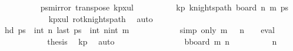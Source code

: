 \begin{isabellebody}
\ \ \ \ \ \ \ \ \isamarkupfalse%
\ {\isacharquery}{\kern0pt}ps{\isacharequal}{\kern0pt}{\isachardoublequoteopen}mirror{}\ {\isacharparenleft}{\kern0pt}transpose\ kp{}x{}ul{\isacharparenright}{\kern0pt}{\isachardoublequoteclose}\isanewline
\ \ \ \ \ \ \ \ \isamarkupfalse%
\ kp{\isacharcolon}{\kern0pt}\ {\isachardoublequoteopen}knights{\isacharunderscore}{\kern0pt}path\ {\isacharparenleft}{\kern0pt}board\ n\ m{\isacharparenright}{\kern0pt}\ {\isacharquery}{\kern0pt}ps{\isachardoublequoteclose}\isanewline
\ \ \ \ \ \ \ \ \ \ \isamarkupfalse%
\ kp{\isacharunderscore}{\kern0pt}{}x{}{\isacharunderscore}{\kern0pt}ul\ rot{}{}{\isacharunderscore}{\kern0pt}knights{\isacharunderscore}{\kern0pt}path\ \isamarkupfalse%
\ auto\isanewline
\ \ \ \ \ \ \ \ \isamarkupfalse%
\ {\isachardoublequoteopen}hd\ {\isacharquery}{\kern0pt}ps\ {\isacharequal}{\kern0pt}\ {\isacharparenleft}{\kern0pt}int\ n{\isacharcomma}{\kern0pt}{}{\isacharparenright}{\kern0pt}{\isachardoublequoteclose}\ {\isachardoublequoteopen}last\ {\isacharquery}{\kern0pt}ps\ {\isacharequal}{\kern0pt}\ {\isacharparenleft}{\kern0pt}int\ n{\isacharminus}{\kern0pt}{}{\isacharcomma}{\kern0pt}int\ m{\isacharminus}{\kern0pt}{}{\isacharparenright}{\kern0pt}{\isachardoublequoteclose}\isanewline
\ \ \ \ \ \ \ \ \ \ \isamarkupfalse%
\ {\isacharparenleft}{\kern0pt}simp\ only{\isacharcolon}{\kern0pt}\ {\isacartoucheopen}m\ {\isacharequal}{\kern0pt}\ {}{\isacartoucheclose}\ {\isacartoucheopen}n\ {\isacharequal}{\kern0pt}\ {}{\isacartoucheclose}\ {\isacharbar}{\kern0pt}\ eval{\isacharparenright}{\kern0pt}{\isacharplus}{\kern0pt}\isanewline
\ \ \ \ \ \ \ \ \isamarkupfalse%
\ \isamarkupfalse%
\ {\isacharquery}{\kern0pt}thesis\ \isamarkupfalse%
\ kp\ \isamarkupfalse%
\ auto\isanewline
\ \ \ \ \ \ \isamarkupfalse%
\isanewline
\ \ \ \ \ \ \ \ \isamarkupfalse%
\ {\isacharquery}{\kern0pt}bboard\ m\ {\isacharparenleft}{\kern0pt}n{\isacharminus}{\kern0pt}{}{\isacharparenright}{\kern0pt}{\isachardoublequoteclose}\isanewline
\ \ \ \ \ \ \ \ \isamarkupfalse%
\ {\isachardoublequoteopen}n{\isacharminus}{\kern0pt}{}\ {\isasymge}\ {}{\isachardoublequoteclose}\isanewline
\ \ \ \ \ \ \ \ \isamarkupfalse%

\end{isabellebody}
